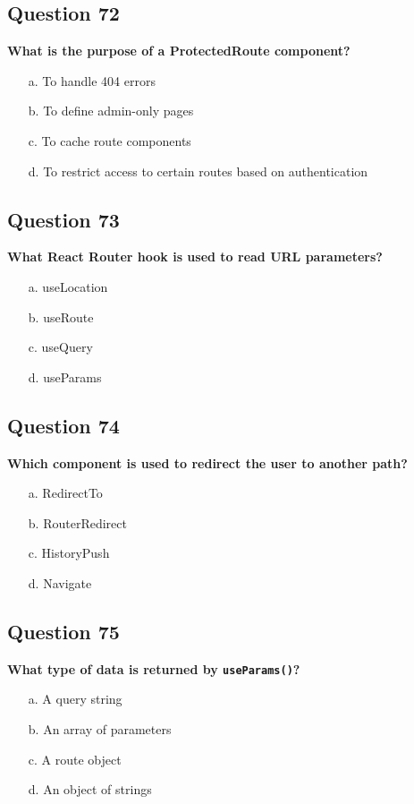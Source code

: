 \documentclass{article}
\begin{document}
\subsection*{Question 72}
\textbf{What is the purpose of a ProtectedRoute component?}

\begin{itemize}
  \item[a.] To handle 404 errors
  \item[b.] To define admin-only pages
  \item[c.] To cache route components
  \item[d.] To restrict access to certain routes based on authentication
\end{itemize}

\subsection*{Question 73}
\textbf{What React Router hook is used to read URL parameters?}

\begin{itemize}
  \item[a.] useLocation
  \item[b.] useRoute
  \item[c.] useQuery
  \item[d.] useParams
\end{itemize}

\subsection*{Question 74}
\textbf{Which component is used to redirect the user to another path?}

\begin{itemize}
  \item[a.] RedirectTo
  \item[b.] RouterRedirect
  \item[c.] HistoryPush
  \item[d.] Navigate
\end{itemize}

\subsection*{Question 75}
\textbf{What type of data is returned by \texttt{useParams()}?}

\begin{itemize}
  \item[a.] A query string
  \item[b.] An array of parameters
  \item[c.] A route object
  \item[d.] An object of strings
\end{itemize}
\end{document}
